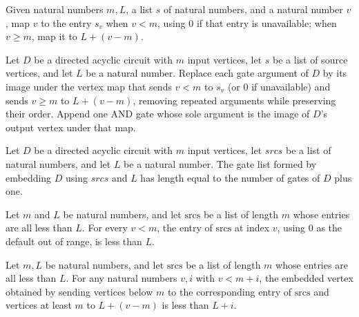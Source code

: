 \begin{definition}
\label{BoolCircuit.embedMap}
\leanok
Given natural numbers $m,L$, a list $s$ of natural numbers, and a natural number $v$,
map $v$ to the entry $s_v$ when $v<m$, using $0$ if that entry is unavailable; when
$v\ge m$, map it to $L+(v-m)$.
\end{definition}

\begin{definition}
\label{BoolCircuit.embedGates}
\leanok
{}
Let $D$ be a directed acyclic circuit with $m$ input vertices, let $s$ be a list of
source vertices, and let $L$ be a natural number. Replace each gate argument of $D$ by
its image under the vertex map that sends $v<m$ to $s_v$ (or $0$ if unavailable) and
sends $v\ge m$ to $L+(v-m)$, removing repeated arguments while preserving their order.
Append one AND gate whose sole argument is the image of $D$'s output vertex under that
map.
\end{definition}

\begin{theorem}
\label{BoolCircuit.length_embedGates}
\leanok
{}
Let $D$ be a directed acyclic circuit with $m$ input vertices, let $srcs$ be a list of
natural numbers, and let $L$ be a natural number. The gate list formed by embedding $D$
using $srcs$ and $L$ has length equal to the number of gates of $D$ plus one.
\end{theorem}

\begin{theorem}
\label{BoolCircuit.getD_src_lt}
\leanok
{}
Let $m$ and $L$ be natural numbers, and let $\mathrm{srcs}$ be a list of length $m$
whose entries are all less than $L$. For every $v<m$, the entry of $\mathrm{srcs}$ at
index $v$, using $0$ as the default out of range, is less than $L$.
\end{theorem}

\begin{theorem}
\label{BoolCircuit.embedMap_lt}
\leanok
{}
Let $m,L$ be natural numbers, and let $\mathrm{srcs}$ be a list of length $m$ whose
entries are all less than $L$. For any natural numbers $v,i$ with $v<m+i$, the embedded
vertex obtained by sending vertices below $m$ to the corresponding entry of
$\mathrm{srcs}$ and vertices at least $m$ to $L+(v-m)$ is less than $L+i$.
\end{theorem}

